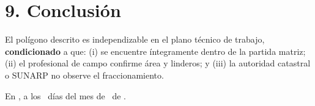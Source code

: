 \documentclass[12pt,a4paper]{article}
\begin{document}
\section*{9. Conclusión}
El polígono descrito es independizable en el plano técnico de trabajo, \textbf{condicionado} a que: (i) se encuentre íntegramente dentro de la partida matriz; (ii) el profesional de campo confirme área y linderos; y (iii) la autoridad catastral o SUNARP no observe el fraccionamiento.

\vspace{0.5em}
\noindent En \LugarOtorgamiento, a los \DiaOtorgamiento\ días del mes de \MesOtorgamiento\ de \AnioOtorgamiento.

\vspace{0.35em}
\noindent
{}
\hfill
{}

\vspace{0.55em}
\\
\vspace{0.2em}
\noindent{}
\end{document}
